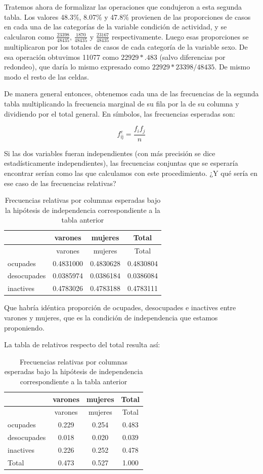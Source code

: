 \documentclass[]{book}
\begin{document}
Tratemos ahora de formalizar las operaciones que condujeron a esta segunda tabla. Los valores 48.3\%, 8.07\% y 47.8\% provienen de las proporciones de casos en cada una de las categorías de la variable condición de actividad, y se calcularon como \(\frac{23398}{48435}\), \(\frac{1870}{48435}\) y \(\frac{23167}{48435}\) respectivamente. Luego esas proporciones se multiplicaron por los totales de casos de cada categoría de la variable sexo. De esa operación obtuvimos 11077 como \(22929*.483\) (salvo diferencias por redondeo), que daría lo mismo expresado como \(22929*23398/48435\). De mismo modo el resto de las celdas.

De manera general entonces, obtenemos cada una de las frecuencias de la segunda tabla multiplicando la frecuencia marginal de su fila por la de su columna y dividiendo por el total general. En símbolos, las
frecuencias esperadas son:

\[f_{\text{ij}}^{e} = \frac{f_{i}f_{j}}{n}\]

Si las dos variables fueran independientes (con más precisión se dice
estadísticamente independientes), las frecuencias conjuntas que se
esperaría encontrar serían como las que calculamos con este
procedimiento. ¿Y qué sería en ese caso de las frecuencias relativas?

\begin{longtable}[]{@{}lccc@{}}
\caption{\label{tab:unnamed-chunk-124}Frecuencias relativas por columnas esperadas bajo la hipótesis de independencia correspondiente a la tabla anterior}\tabularnewline
\toprule
& varones & mujeres & Total\tabularnewline
\midrule
\endfirsthead
\toprule
& varones & mujeres & Total\tabularnewline
\midrule
\endhead
ocupades & 0.4831000 & 0.4830628 & 0.4830804\tabularnewline
desocupades & 0.0385974 & 0.0386184 & 0.0386084\tabularnewline
inactives & 0.4783026 & 0.4783188 & 0.4783111\tabularnewline
\bottomrule
\end{longtable}

Que habría idéntica proporción de ocupades, desocupades e inactives entre varones y mujeres, que es la condición de independencia que estamos proponiendo.

La tabla de relativos respecto del total resulta así:

\begin{longtable}[]{@{}lccc@{}}
\caption{\label{tab:unnamed-chunk-125}Frecuencias relativas por columnas esperadas bajo la hipótesis de independencia correspondiente a la tabla anterior}\tabularnewline
\toprule
& varones & mujeres & Total\tabularnewline
\midrule
\endfirsthead
\toprule
& varones & mujeres & Total\tabularnewline
\midrule
\endhead
ocupades & 0.229 & 0.254 & 0.483\tabularnewline
desocupades & 0.018 & 0.020 & 0.039\tabularnewline
inactives & 0.226 & 0.252 & 0.478\tabularnewline
Total & 0.473 & 0.527 & 1.000\tabularnewline
\bottomrule
\end{longtable}
\end{document}
